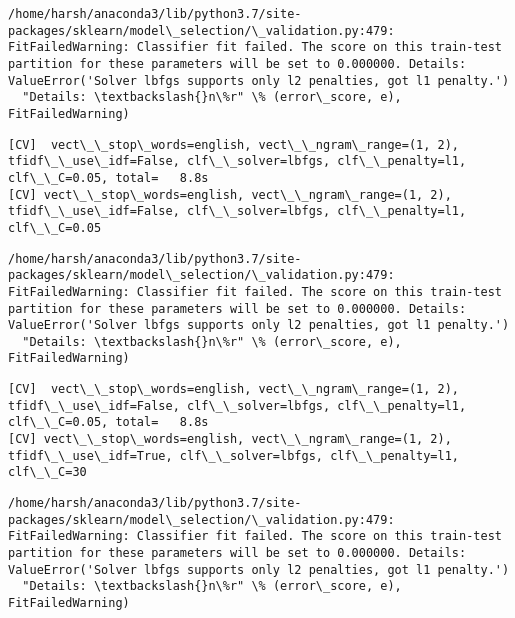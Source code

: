 \documentclass[11pt]{article}
\begin{document}
    \begin{Verbatim}[commandchars=\\\{\}]
/home/harsh/anaconda3/lib/python3.7/site-packages/sklearn/model\_selection/\_validation.py:479: FitFailedWarning: Classifier fit failed. The score on this train-test partition for these parameters will be set to 0.000000. Details: 
ValueError('Solver lbfgs supports only l2 penalties, got l1 penalty.')
  "Details: \textbackslash{}n\%r" \% (error\_score, e), FitFailedWarning)

    \end{Verbatim}

    \begin{Verbatim}[commandchars=\\\{\}]
[CV]  vect\_\_stop\_words=english, vect\_\_ngram\_range=(1, 2), tfidf\_\_use\_idf=False, clf\_\_solver=lbfgs, clf\_\_penalty=l1, clf\_\_C=0.05, total=   8.8s
[CV] vect\_\_stop\_words=english, vect\_\_ngram\_range=(1, 2), tfidf\_\_use\_idf=False, clf\_\_solver=lbfgs, clf\_\_penalty=l1, clf\_\_C=0.05 

    \end{Verbatim}

    \begin{Verbatim}[commandchars=\\\{\}]
/home/harsh/anaconda3/lib/python3.7/site-packages/sklearn/model\_selection/\_validation.py:479: FitFailedWarning: Classifier fit failed. The score on this train-test partition for these parameters will be set to 0.000000. Details: 
ValueError('Solver lbfgs supports only l2 penalties, got l1 penalty.')
  "Details: \textbackslash{}n\%r" \% (error\_score, e), FitFailedWarning)

    \end{Verbatim}

    \begin{Verbatim}[commandchars=\\\{\}]
[CV]  vect\_\_stop\_words=english, vect\_\_ngram\_range=(1, 2), tfidf\_\_use\_idf=False, clf\_\_solver=lbfgs, clf\_\_penalty=l1, clf\_\_C=0.05, total=   8.8s
[CV] vect\_\_stop\_words=english, vect\_\_ngram\_range=(1, 2), tfidf\_\_use\_idf=True, clf\_\_solver=lbfgs, clf\_\_penalty=l1, clf\_\_C=30 

    \end{Verbatim}

    \begin{Verbatim}[commandchars=\\\{\}]
/home/harsh/anaconda3/lib/python3.7/site-packages/sklearn/model\_selection/\_validation.py:479: FitFailedWarning: Classifier fit failed. The score on this train-test partition for these parameters will be set to 0.000000. Details: 
ValueError('Solver lbfgs supports only l2 penalties, got l1 penalty.')
  "Details: \textbackslash{}n\%r" \% (error\_score, e), FitFailedWarning)

    \end{Verbatim}
\end{document}
